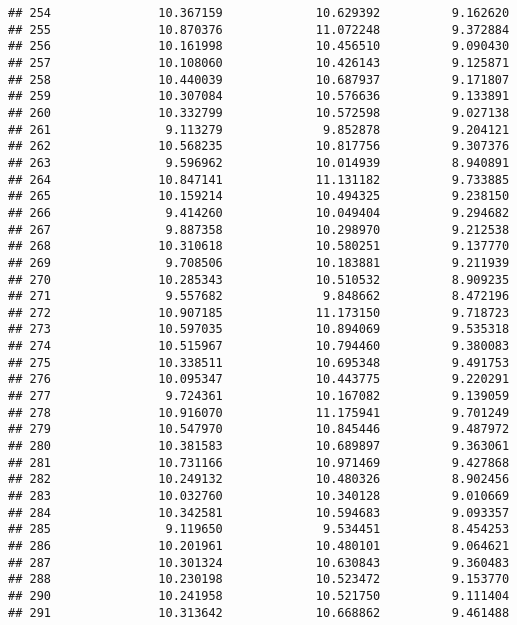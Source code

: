 \documentclass[
]{article}
\begin{document}
\begin{verbatim}
## 254               10.367159             10.629392          9.162620
## 255               10.870376             11.072248          9.372884
## 256               10.161998             10.456510          9.090430
## 257               10.108060             10.426143          9.125871
## 258               10.440039             10.687937          9.171807
## 259               10.307084             10.576636          9.133891
## 260               10.332799             10.572598          9.027138
## 261                9.113279              9.852878          9.204121
## 262               10.568235             10.817756          9.307376
## 263                9.596962             10.014939          8.940891
## 264               10.847141             11.131182          9.733885
## 265               10.159214             10.494325          9.238150
## 266                9.414260             10.049404          9.294682
## 267                9.887358             10.298970          9.212538
## 268               10.310618             10.580251          9.137770
## 269                9.708506             10.183881          9.211939
## 270               10.285343             10.510532          8.909235
## 271                9.557682              9.848662          8.472196
## 272               10.907185             11.173150          9.718723
## 273               10.597035             10.894069          9.535318
## 274               10.515967             10.794460          9.380083
## 275               10.338511             10.695348          9.491753
## 276               10.095347             10.443775          9.220291
## 277                9.724361             10.167082          9.139059
## 278               10.916070             11.175941          9.701249
## 279               10.547970             10.845446          9.487972
## 280               10.381583             10.689897          9.363061
## 281               10.731166             10.971469          9.427868
## 282               10.249132             10.480326          8.902456
## 283               10.032760             10.340128          9.010669
## 284               10.342581             10.594683          9.093357
## 285                9.119650              9.534451          8.454253
## 286               10.201961             10.480101          9.064621
## 287               10.301324             10.630843          9.360483
## 288               10.230198             10.523472          9.153770
## 290               10.241958             10.521750          9.111404
## 291               10.313642             10.668862          9.461488

\end{verbatim}
\end{document}
